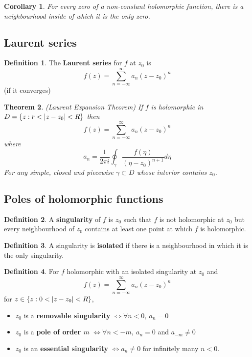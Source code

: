 \documentclass[12pt]{article}
\newtheorem{thm}{Theorem}[section]
\newtheorem{cor}[thm]{Corollary}
\theoremstyle{definition}
\newtheorem{defn}{Definition}[section]
\DeclarePairedDelimiter\abs{\lvert}{\rvert}
\begin{document}
\begin{cor}
  For every zero of a non-constant holomorphic function, there is a neighbourhood inside of which it is the only zero.
\end{cor}

\subsection{Laurent series}

\begin{defn}
  The \textbf{Laurent series} for $f$ at $z_0$ is
  $$f(z) = \sum_{n = -\infty}^{\infty}a_n(z - z_0)^n$$
  (if it converges)
\end{defn}

\begin{thm}
  (Laurent Expansion Theorem)
  If $f$ is holomorphic in $D = \{z : r < \abs{z - z_0} < R\}$ then
  $$f(z) = \sum_{n = -\infty}^{\infty}a_n(z - z_0)^n$$
  where
  $$a_n = \frac{1}{2\pi i}\oint_{\gamma}\frac{f(\eta)}{(\eta - z_0)^{n + 1}}d\eta$$
  For any simple, closed and piecewise $\gamma \subset D$ whose interior contains $z_0$.
\end{thm}

\subsection{Poles of holomorphic functions}

\begin{defn}
  A \textbf{singularity} of $f$ is $z_0$ such that $f$ is not holomorphic at $z_0$ but every neighbourhood of $z_0$ contains at least one point at which $f$ is holomorphic.
\end{defn}

\begin{defn}
  A singularity is \textbf{isolated} if there is a neighbourhood in which it is the only singularity.
\end{defn}

\begin{defn}
  For $f$ holomorphic with an isolated singularity at $z_0$ and
  $$f(z) = \sum_{n = -\infty}^{\infty}a_n(z - z_0)^n$$
  for $z \in \{z : 0 < \abs{z - z_0} < R\}$,
  \begin{itemize}
    \item $z_0$ is a \textbf{removable singularity} $\iff \forall n < 0,\ a_n = 0$
    \item $z_0$ is a \textbf{pole of order $m$} $\iff \forall n < -m,\ a_n = 0$ and $a_{-m} \neq 0$
    \item $z_0$ is an \textbf{essential singularity} $\iff a_n \neq 0$ for infinitely many $n < 0$.
  \end{itemize}
\end{defn}
\end{document}
